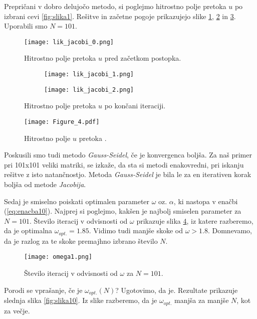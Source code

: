 \documentclass[12pt,a4paper]{article}
\begin{document}
\noindent Prepričani v dobro delujočo metodo, si poglejmo hitrostno polje pretoka $u$ po izbrani cevi \ref{fig:slika1}. Rešitve in začetne pogoje prikazujejo slike \ref{fig:slika6},  \ref{fig:slika7} in \ref{fig:slika8}. Uporabili smo $N=101$.

\begin{figure}[H]
\begin{center}
\texttt{[image: lik\_jacobi\_0.png]}
\caption{Hitrostno polje pretoka $u$ pred začetkom postopka.} \label{fig:slika6}
\end{center}
\end{figure}

\begin{figure}[H]
    \centering
    \begin{subfigure}[b]{0.49\textwidth}
        \texttt{[image: lik\_jacobi\_1.png]}
    \end{subfigure}
    \begin{subfigure}[b]{0.49\textwidth}
        \texttt{[image: lik\_jacobi\_2.png]}
    \end{subfigure}
    \caption{Hitrostno polje pretoka $u$ po končani iteraciji.} \label{fig:slika7}
\end{figure}

\begin{figure}[H]
\begin{center}
\texttt{[image: Figure\_4.pdf]}
\caption{Hitrostno polje $u$ pretoka .} \label{fig:slika8}
\end{center}
\end{figure}

\noindent Poskusili smo tudi metodo \textit{Gauss-Seidel}, če je konvergenca boljša. Za naš primer pri 101x101 veliki matriki, se izkaže, da sta si metodi enakovredni, pri iskanju rešitve z isto natančnostjo. Metoda \textit{Gauss-Seidel} je bila le za en iterativen korak boljša od metode \textit{Jacobija}.

Sedaj je smiselno poiskati optimalen parameter $\omega$ oz. $\alpha$, ki nastopa v enačbi (\ref{eq:enacba10}). Najprej si poglejmo, kakšen je najbolj smiselen parameter za $N=101$. Število iteracij v odvisnosti od $\omega$ prikazuje slika \ref{fig:slika9}, iz katere razberemo, da je optimalna $\omega_{opt.}=1.85$. Vidimo tudi manjše skoke od $\omega>1.8$. Domnevamo, da je razlog za te skoke premajhno izbrano število $N$.

\begin{figure}[H]
\begin{center}
\texttt{[image: omega1.png]}
\caption{Število iteracij v odvisnosti od $\omega$ za $N=101$.} \label{fig:slika9}
\end{center}
\end{figure}
\noindent Porodi se vprašanje, če je $\omega_{opt.}(N)$? Ugotovimo, da je. Rezultate prikazuje slednja slika \ref{fig:slika10}. Iz slike razberemo, da je $\omega_{opt.}$ manjša za manjše $N$, kot za večje.
\end{document}

